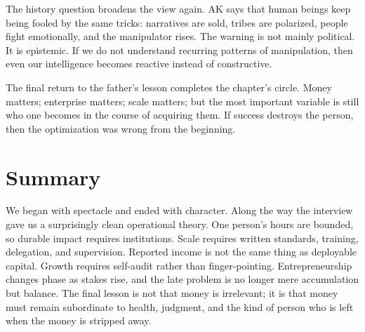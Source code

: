 The history question broadens the view again. AK says that human beings keep being fooled by the same tricks: narratives are sold, tribes are polarized, people fight emotionally, and the manipulator rises. The warning is not mainly political. It is epistemic. If we do not understand recurring patterns of manipulation, then even our intelligence becomes reactive instead of constructive.

The final return to the father's lesson completes the chapter's circle. Money matters; enterprise matters; scale matters; but the most important variable is still who one becomes in the course of acquiring them. If success destroys the person, then the optimization was wrong from the beginning.

\section{Summary}

We began with spectacle and ended with character. Along the way the interview gave us a surprisingly clean operational theory. One person's hours are bounded, so durable impact requires institutions. Scale requires written standards, training, delegation, and supervision. Reported income is not the same thing as deployable capital. Growth requires self-audit rather than finger-pointing. Entrepreneurship changes phase as stakes rise, and the late problem is no longer mere accumulation but balance. The final lesson is not that money is irrelevant; it is that money must remain subordinate to health, judgment, and the kind of person who is left when the money is stripped away.